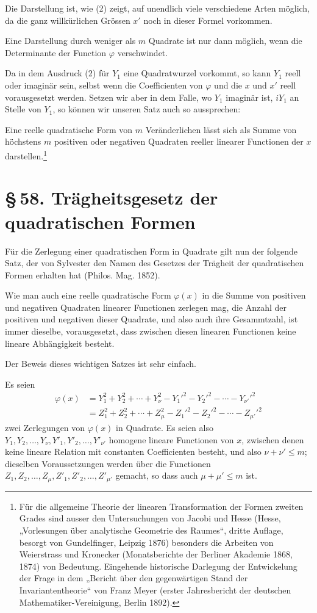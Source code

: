 \documentclass[11pt]{article}
\providecommand{\sect}[2]{\section*{\S\,#1. #2}}
\begin{document}
Die Darstellung ist, wie (2) zeigt, auf unendlich viele verschiedene Arten möglich, da die ganz willkürlichen Grössen $x'$ noch in dieser Formel vorkommen.

Eine Darstellung durch weniger als $m$ Quadrate ist nur dann möglich, wenn die Determinante der Function $\varphi$ verschwindet.

Da in dem Ausdruck (2) für $Y_1$ eine Quadratwurzel vorkommt, so kann $Y_1$ reell oder imaginär sein, selbst wenn die Coefficienten von $\varphi$ und die $x$ und $x'$ reell vorausgesetzt werden. Setzen wir aber in dem Falle, wo $Y_1$ imaginär ist, $iY_1$ an Stelle von $Y_1$, so können wir unseren Satz auch so aussprechen:

Eine reelle quadratische Form von $m$ Veränderlichen lässt sich als Summe von höchstens $m$ positiven oder negativen Quadraten reeller linearer Functionen der $x$ darstellen.\footnote{Für die allgemeine Theorie der linearen Transformation der Formen zweiten Grades sind ausser den Untersuchungen von Jacobi und Hesse (Hesse, „Vorlesungen über analytische Geometrie des Raumes“, dritte Auflage, besorgt von Gundelfinger, Leipzig 1876) besonders die Arbeiten von Weierstrass und Kronecker (Monatsberichte der Berliner Akademie 1868, 1874) von Bedeutung. Eingehende historische Darlegung der Entwickelung der Frage in dem „Bericht über den gegenwärtigen Stand der Invariantentheorie“ von Franz Meyer (erster Jahresbericht der deutschen Mathematiker-Vereinigung, Berlin 1892).}

\sect{58}{Trägheitsgesetz der quadratischen Formen}

Für die Zerlegung einer quadratischen Form in Quadrate gilt nun der folgende Satz, der von Sylvester den Namen des Gesetzes der Trägheit der quadratischen Formen erhalten hat (Philos. Mag. 1852).

Wie man auch eine reelle quadratische Form $\varphi(x)$ in die Summe von positiven und negativen Quadraten linearer Functionen zerlegen mag, die Anzahl der positiven und negativen dieser Quadrate, und also auch ihre Gesammtzahl, ist immer dieselbe, vorausgesetzt, dass zwischen diesen linearen Functionen keine lineare Abhängigkeit besteht.

Der Beweis dieses wichtigen Satzes ist sehr einfach.

Es seien
\begin{equation}
\begin{aligned}
 \varphi(x)&=Y_1^2+Y_2^2+\cdots+Y_\nu^2-Y_1'^2-Y_2'^2-\cdots-Y_{\nu'}'^2\\
 &=Z_1^2+Z_2^2+\cdots+Z_\mu^2-Z_1'^2-Z_2'^2-\cdots-Z_{\mu'}'^2
\end{aligned}
\tag{1}
\end{equation}
zwei Zerlegungen von $\varphi(x)$ in Quadrate. Es seien also $Y_1,Y_2,\ldots,Y_\nu,Y'_1,Y'_2,\ldots,Y'_{\nu'}$ homogene lineare Functionen von $x$, zwischen denen keine lineare Relation mit constanten Coefficienten besteht, und also $\nu+\nu'\leq m$; dieselben Voraussetzungen werden über die Functionen $Z_1,Z_2,\ldots,Z_\mu,Z'_1,Z'_2,\ldots,Z'_{\mu'}$ gemacht, so dass auch $\mu+\mu'\leq m$ ist.
\end{document}
